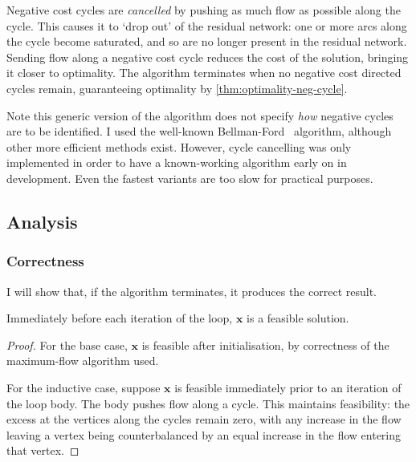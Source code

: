 Negative cost cycles are \emph{cancelled} by pushing as much flow as possible along the cycle. This causes it to `drop out' of the residual network: one or more arcs along the cycle become saturated, and so are no longer present in the residual network. Sending flow along a negative cost cycle reduces the cost of the solution, bringing it closer to optimality. The algorithm terminates when no negative cost directed cycles remain, guaranteeing optimality by \cref{thm:optimality-neg-cycle}.

Note this generic version of the algorithm does not specify \emph{how} negative cycles are to be identified. I used the well-known Bellman-Ford~\cite[p.~651]{CLRS:2009} algorithm, although other more efficient methods exist. However, cycle cancelling was only implemented in order to have a known-working algorithm early on in development. Even the fastest variants are too slow for practical purposes.

\subsection{Analysis}

\subsubsection{Correctness}

I will show that, if the algorithm terminates, it produces the correct result. \\

\begin{thm} \label{thm:cycle-cancelling-invariant}
Immediately before each iteration of the loop, $\mathbf{x}$ is a feasible solution.
\end{thm} 
\begin{proof}
For the base case, $\mathbf{x}$ is feasible after initialisation, by correctness of the maximum-flow algorithm used.

For the inductive case, suppose $\mathbf{x}$ is feasible immediately prior to an iteration of the loop body. The body pushes flow along a cycle. This maintains feasibility: the excess at the vertices along the cycles remain zero, with any increase in the flow leaving a vertex being counterbalanced by an equal increase in the flow entering that vertex.
\end{proof}

